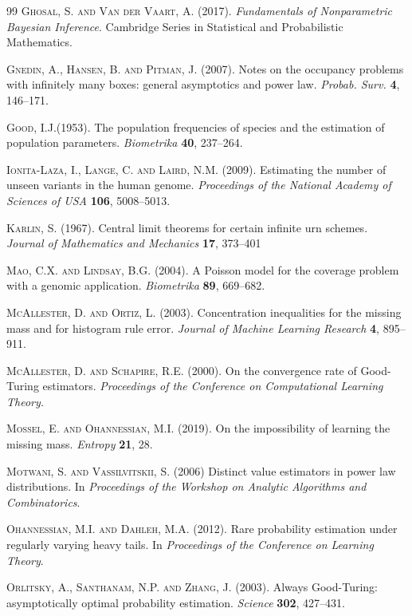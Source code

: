 \documentclass{article}
\newcommand{\1}{\boldsymbol{1}}
\theoremstyle{plain}
\begin{document}
\begin{thebibliography}{99}
\textsc{Ghosal, S. and Van der Vaart, A.} (2017). \textit{Fundamentals of Nonparametric Bayesian Inference}. Cambridge Series in Statistical and Probabilistic Mathematics.

\textsc{Gnedin, A., Hansen, B. and Pitman, J.} (2007). Notes on the occupancy problems with infinitely many boxes: general asymptotics and power law. \textit{Probab. Surv.} \textbf{4}, 146--171.

\textsc{Good, I.J.}(1953). The population frequencies of species and the estimation of population parameters. \textit{Biometrika} \textbf{40}, 237--264.


\textsc{Ionita-Laza, I., Lange, C. and Laird, N.M.} (2009). Estimating the number of unseen variants in the human genome. \textit{Proceedings of the National Academy of Sciences of USA} \textbf{106}, 5008--5013.

\textsc{Karlin, S.} (1967). Central limit theorems for certain infinite urn schemes. \textit{Journal of Mathematics and Mechanics} \textbf{17}, 373--401

\textsc{Mao, C.X. and Lindsay, B.G.} (2004). A Poisson model for the coverage problem with a genomic application. \textit{Biometrika} \textbf{89}, 669--682.

\textsc{McAllester, D. and Ortiz, L.} (2003). Concentration inequalities for the missing mass and for histogram rule error. \textit{Journal of Machine Learning Research} \textbf{4}, 895--911.

\textsc{McAllester, D. and Schapire, R.E.} (2000). On the convergence rate of Good-Turing estimators. \textit{Proceedings of the Conference on Computational Learning Theory.}

\textsc{Mossel, E. and  Ohannessian, M.I.} (2019). On the impossibility of learning the missing mass. \textit{Entropy} \textbf{21}, 28.

\textsc{Motwani, S. and Vassilvitskii, S.} (2006) Distinct value estimators in power law distributions. In \textit{Proceedings of the Workshop on Analytic Algorithms and Combinatorics}.

\textsc{Ohannessian, M.I. and Dahleh, M.A.} (2012). Rare probability estimation under regularly varying heavy tails. In \textit{Proceedings of the Conference on Learning Theory}.

\textsc{Orlitsky, A., Santhanam, N.P. and Zhang, J.} (2003). Always Good-Turing: asymptotically optimal probability estimation. \textit{Science} \textbf{302}, 427--431.


\end{thebibliography}
\end{document}

